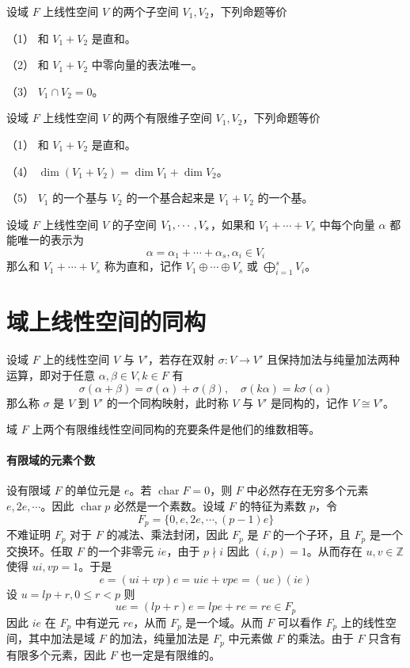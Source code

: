 \begin{theorem}
	设域 $F$ 上线性空间 $V$ 的两个子空间 $V_1,V_2$，下列命题等价
	
	（1） 和 $V_1+V_2$ 是直和。
	
	（2） 和 $V_1+V_2$ 中零向量的表法唯一。
	
	（3） $V_1 \cap V_2 = 0$。
\end{theorem}

\begin{theorem}
	设域 $F$ 上线性空间 $V$ 的两个有限维子空间 $V_1,V_2$，下列命题等价
	
	（1） 和 $V_1+V_2$ 是直和。
	
	（4） $\dim(V_1+V_2) = \dim V_1 + \dim V_2$。
	
	（5） $V_1$ 的一个基与 $V_2$ 的一个基合起来是 $V_1+V_2$ 的一个基。
\end{theorem}

\begin{definition}
	设域 $F$ 上线性空间 $V$ 的子空间 $V_1,\cdots,V_s$，如果和 $V_1+\cdots+V_s$ 中每个向量 $\alpha$ 都能唯一的表示为
	\[ \alpha = \alpha_1 + \cdots + \alpha_s, \alpha_i \in V_i \]
	那么和 $V_1 + \cdots + V_s$ 称为直和，记作 $V_1 \oplus \cdots \oplus V_s$ 或 $\displaystyle\bigoplus_{i=1}^s V_i$。
\end{definition}

\section{域上线性空间的同构}

\begin{definition}[同构]
	设域 $F$ 上的线性空间 $V$ 与 $V'$，若存在双射 $\sigma : V \to V'$ 且保持加法与纯量加法两种运算，即对于任意 $\alpha,\beta \in V,k\in F$ 有
	\[ \sigma(\alpha+\beta) = \sigma(\alpha) + \sigma(\beta), \quad \sigma(k\alpha) = k\sigma(\alpha) \]
	那么称 $\sigma$ 是 $V$ 到 $V'$ 的一个同构映射，此时称 $V$ 与 $V'$ 是同构的，记作 $V \cong V'$。
\end{definition}

\begin{theorem}
	域 $F$ 上两个有限维线性空间同构的充要条件是他们的维数相等。
\end{theorem}

\paragraph{有限域的元素个数}

设有限域 $F$ 的单位元是 $e$。若 $\operatorname{char} F = 0$，则 $F$ 中必然存在无穷多个元素 $e,2e,\cdots$。因此 $\operatorname{char} p$ 必然是一个素数。设域 $F$ 的特征为素数 $p$，令
\[ F_p = \{ 0,e,2e,\cdots,(p-1)e \} \]
不难证明 $F_p$ 对于 $F$ 的减法、乘法封闭，因此 $F_p$ 是 $F$ 的一个子环，且 $F_p$ 是一个交换环。任取 $F$ 的一个非零元 $ie$，由于 $p \nmid i$ 因此 $(i,p) = 1$。从而存在 $u,v \in \mathbb{Z}$ 使得 $ui,vp=1$。于是
\[ e = (ui+vp)e = uie + vpe = (ue)(ie) \]
设 $u = lp + r, 0 \leqslant r < p$ 则
\[ ue = (lp + r) e = lpe + re = re \in F_p \]
因此 $ie$ 在 $F_p$ 中有逆元 $re$，从而 $F_p$ 是一个域。从而 $F$ 可以看作 $F_p$ 上的线性空间，其中加法是域 $F$ 的加法，纯量加法是 $F_p$ 中元素做 $F$ 的乘法。由于 $F$ 只含有有限多个元素，因此 $F$ 也一定是有限维的。

